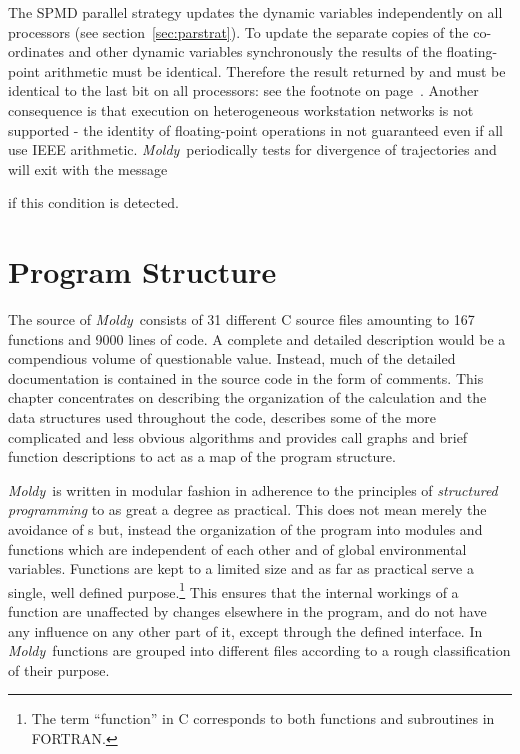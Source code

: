 \documentclass[a4paper,twoside]{report}
\newcommand{\moldy}{\emph{Moldy}}
\begin{document}
The SPMD parallel strategy updates the dynamic variables independently on
all processors (see section~\ref{sec:parstrat}).  To update the
separate copies of the co-ordinates and other dynamic variables
synchronously the results of the floating-point arithmetic must be
identical.  Therefore the result returned by  and
 must be identical to the last bit on all processors:
see the footnote on page~\pageref{sec:parstrat}.  Another consequence
is that execution on heterogeneous workstation networks is not
supported - the identity of floating-point operations in not
guaranteed even if all use IEEE arithmetic.  \moldy\ periodically
tests for divergence of trajectories and will exit with the message


\noindent if this condition is detected.

\chapter{Program Structure} %
The source of \moldy\ consists of 31 different C source files
amounting to 167 functions and 9000 lines of code. A complete and
detailed description would be a compendious volume of questionable
value.  Instead, much of the detailed documentation is contained in
the source code in the form of comments. This chapter concentrates on
describing the organization of the calculation and the data structures
used throughout the code, describes some of the more complicated and
less obvious algorithms and provides call graphs and brief function
descriptions to act as a map of the program structure.

\moldy\ is written in modular fashion in adherence to the principles
of \emph{structured programming} to as great a degree as practical.
This does not mean merely the avoidance of s but, instead
the organization of the program into modules and functions which are
independent of each other and of global environmental variables.
Functions are kept to a limited size and as far as practical
serve a single, well defined purpose.\footnote{The term ``function''
  in C corresponds to both functions and subroutines in FORTRAN.} This
ensures that the internal workings of a function are unaffected by
changes elsewhere in the program, and do not have any influence on any
other part of it, except through the defined interface.  In \moldy\,
functions are grouped into different files according to a rough
classification of their purpose.  
\end{document}
